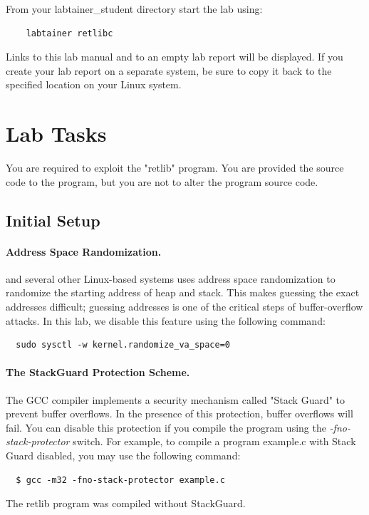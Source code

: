 From your labtainer_student directory start the lab using:
\begin{verbatim}
    labtainer retlibc
\end{verbatim}
Links to this lab manual and to an empty lab report will be displayed.  If you create your lab report on a separate system,
be sure to copy it back to the specified location on your Linux system.


\section{Lab Tasks}
You are required to exploit the "retlib" program.  You are provided the
source code to the program, but you are not to alter the program source code.

\subsection{Initial Setup}

\paragraph{Address Space Randomization.}
\ubuntu and several other Linux-based systems uses address space
randomization to randomize the starting address of heap and
stack. This makes guessing the exact addresses difficult; guessing
addresses is one of the critical steps of buffer-overflow attacks.  In
this lab, we disable this feature using the following command:

\begin{verbatim}
  sudo sysctl -w kernel.randomize_va_space=0
\end{verbatim}


\paragraph{The StackGuard Protection Scheme.}
The GCC compiler implements a security mechanism called
"Stack Guard" to prevent buffer overflows. In the presence of this
protection, buffer overflows will fail. You can disable this
protection if you compile the program using the
\emph{-fno-stack-protector} switch. For example, to compile a program
example.c with Stack Guard disabled, you may use the following command:
\begin{verbatim}
  $ gcc -m32 -fno-stack-protector example.c
\end{verbatim}

The retlib program was compiled without StackGuard.

